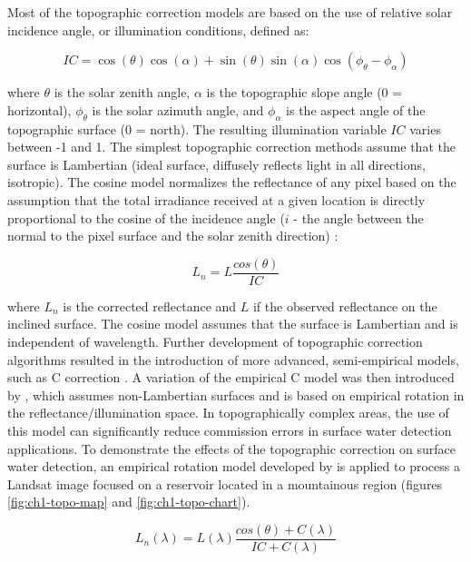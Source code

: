 Most of the topographic correction models are based on the use of relative solar incidence angle, or illumination conditions, defined as: 

\begin{equation}
\label{eq:ic}
IC = \cos(\theta) \cos(\alpha) + \sin(\theta) \sin(\alpha) \cos(\phi_{\theta} - \phi_{\alpha})
\end{equation}

where $\theta$ is the solar zenith angle, $\alpha$ is the topographic slope angle (0 = horizontal), $\phi_{\theta}$ is the solar azimuth angle, and $\phi_{\alpha}$ is the aspect angle of the topographic surface (0 = north). The resulting illumination variable $IC$ varies between -1 and 1. The simplest topographic correction methods assume that the surface is Lambertian (ideal surface, diffusely reflects light in all directions, isotropic). The cosine model normalizes the reflectance of any pixel based on the assumption that the total irradiance received at a given location is directly proportional to the cosine of the incidence angle ($i$ - the angle between the normal to the pixel surface and the solar zenith direction) \citep{teillet1982slope}:

\begin{equation}
\label{eq:cosine}
L_n = L \frac{cos(\theta)}{IC}
\end{equation}

where $L_n$ is the corrected reflectance and $L$ if the observed reflectance on the inclined surface. The cosine model assumes that the surface is Lambertian and is independent of wavelength. Further development of topographic correction algorithms resulted in the introduction of more advanced, semi-empirical models, such as C correction \citep{teillet1982slope}. A variation of the empirical C model was then introduced by \citep{tan2013improved}, which assumes non-Lambertian surfaces and is based on empirical rotation in the reflectance/illumination space. In topographically complex areas, the use of this model can significantly reduce commission errors in surface water detection applications. To demonstrate the effects of the topographic correction on surface water detection, an empirical rotation model developed by \citep{tan2013improved} is applied to process a Landsat image focused on a reservoir located in a mountainous region (figures \ref{fig:ch1-topo-map} and \ref{fig:ch1-topo-chart}).

\begin{equation}
\label{eq:topo-c}
L_n(\lambda) = L(\lambda) \frac{cos(\theta) + C(\lambda)}{IC + C(\lambda)}
\end{equation}

